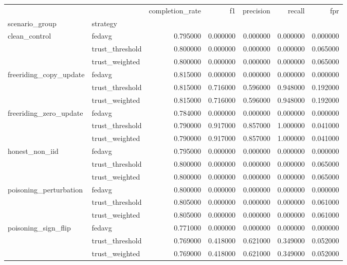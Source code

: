 \begin{tabular}{llrrrrr}
\toprule
 &  & completion_rate & f1 & precision & recall & fpr \\
scenario_group & strategy &  &  &  &  &  \\
\midrule
\multirow[t]{3}{*}{clean_control} & fedavg & 0.795000 & 0.000000 & 0.000000 & 0.000000 & 0.000000 \\
 & trust_threshold & 0.800000 & 0.000000 & 0.000000 & 0.000000 & 0.065000 \\
 & trust_weighted & 0.800000 & 0.000000 & 0.000000 & 0.000000 & 0.065000 \\
\cline{1-7}
\multirow[t]{3}{*}{freeriding_copy_update} & fedavg & 0.815000 & 0.000000 & 0.000000 & 0.000000 & 0.000000 \\
 & trust_threshold & 0.815000 & 0.716000 & 0.596000 & 0.948000 & 0.192000 \\
 & trust_weighted & 0.815000 & 0.716000 & 0.596000 & 0.948000 & 0.192000 \\
\cline{1-7}
\multirow[t]{3}{*}{freeriding_zero_update} & fedavg & 0.784000 & 0.000000 & 0.000000 & 0.000000 & 0.000000 \\
 & trust_threshold & 0.790000 & 0.917000 & 0.857000 & 1.000000 & 0.041000 \\
 & trust_weighted & 0.790000 & 0.917000 & 0.857000 & 1.000000 & 0.041000 \\
\cline{1-7}
\multirow[t]{3}{*}{honest_non_iid} & fedavg & 0.795000 & 0.000000 & 0.000000 & 0.000000 & 0.000000 \\
 & trust_threshold & 0.800000 & 0.000000 & 0.000000 & 0.000000 & 0.065000 \\
 & trust_weighted & 0.800000 & 0.000000 & 0.000000 & 0.000000 & 0.065000 \\
\cline{1-7}
\multirow[t]{3}{*}{poisoning_perturbation} & fedavg & 0.800000 & 0.000000 & 0.000000 & 0.000000 & 0.000000 \\
 & trust_threshold & 0.805000 & 0.000000 & 0.000000 & 0.000000 & 0.061000 \\
 & trust_weighted & 0.805000 & 0.000000 & 0.000000 & 0.000000 & 0.061000 \\
\cline{1-7}
\multirow[t]{3}{*}{poisoning_sign_flip} & fedavg & 0.771000 & 0.000000 & 0.000000 & 0.000000 & 0.000000 \\
 & trust_threshold & 0.769000 & 0.418000 & 0.621000 & 0.349000 & 0.052000 \\
 & trust_weighted & 0.769000 & 0.418000 & 0.621000 & 0.349000 & 0.052000 \\
\cline{1-7}
\bottomrule
\end{tabular}
